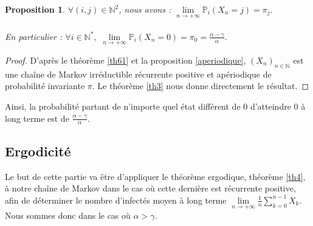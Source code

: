 \documentclass[12pt,a4paper]{report}
\newtheorem{prop}[thm]{Proposition}
\theoremstyle{remark}
\begin{document}
\begin{prop}
$\forall (i,j) \in \mathbb{N}^2$, nous avons : $\lim\limits_{n \to +\infty} \mathbb{P}_i(X_n = j) = \pi_j.$
\\
\\
En particulier : $\forall i \in \mathbb{N}^*, \, \, \lim\limits_{n \to +\infty} \mathbb{P}_i(X_n = 0) = \pi_0 = \frac{\alpha - \gamma}{\alpha}.$
\end{prop}
\begin{proof}
D'après le théorème \ref{th61} et la proposition \ref{aperiodique}, $(X_n)_{n \in \mathbb{N}}$ est une chaîne de Markov irréductible récurrente positive et apériodique de probabilité invariante $\pi$. Le théorème \ref{th3} nous donne directement le résultat.
\end{proof}

Ainsi, la probabilité partant de n'importe quel état différent de $0$ d'atteindre $0$ à long terme est de $\frac{\alpha - \gamma}{\alpha}$.

\subsection{Ergodicité}
\vspace{0.6cm}

Le but de cette partie va être d'appliquer le théorème ergodique, théorème \ref{th4},  à notre chaîne de Markov dans le cas où cette dernière est récurrente positive, afin de déterminer le nombre d'infectés moyen à long terme $\lim\limits_{n \to +\infty} \frac{1}{n} \sum\limits_{k=0}^{n-1} X_k$. Nous sommes donc dans le cas où $\alpha > \gamma$.
\end{document}
